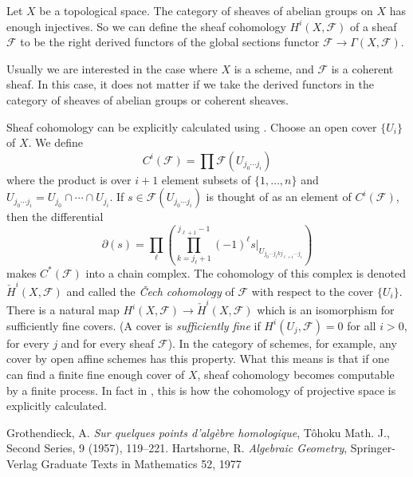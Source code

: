 \documentclass[12pt]{article}
\newcommand{\F}{\mathcal{F}}
\begin{document}
Let $X$ be a topological space.   The category of sheaves of abelian groups on $X$ has enough injectives.  So we can define the sheaf cohomology $H^i(X,\mathcal{F})$ of a sheaf $\mathcal{F}$ to be the right derived functors of the global sections functor $\mathcal{F}\to \Gamma(X,\mathcal{F})$.

Usually we are interested in the case where $X$ is a scheme, and $\mathcal{F}$ is a coherent sheaf.  In this case, it does not matter if we take the derived functors in the category of sheaves of abelian groups or coherent sheaves.

Sheaf cohomology can be explicitly calculated using .  Choose an open cover $\{U_i\}$ of $X$.  We define
\[
C^i(\F)=\prod \F(U_{j_0\cdots j_i})
\]
where the product is over $i+1$ element subsets of $\{1,\ldots,n\}$
and $U_{j_0\cdots j_i}=U_{j_0}\cap\cdots\cap U_{j_i}$.  If
$s\in\F(U_{j_0\cdots j_i})$ is thought of as an element of $C^i(\F)$,
then the differential 
\[
\partial(s)=\prod_{\ell}
\left(\prod_{k=j_{\ell}+1}^{j_{\ell+1}-1}(-1)^\ell s|_{U_{j_0\cdots
    j_\ell k j_{\ell+1}\cdots j_i}}\right)
\]
makes $C^*(\F)$ into a chain complex.  The cohomology of this complex is denoted $\check{H}^i(X,\F)$ and called the {\em \v{C}ech cohomology} of $\F$ with respect to the cover $\{U_i\}$.  There is a natural map $H^i(X,\F)\to\check{H}^i(X,\F)$ which is an isomorphism for sufficiently fine covers.  (A cover is \emph{sufficiently fine} if $H^i(U_j,\F)=0$ for all $i>0$, for every $j$ and for every sheaf $\F$).  In the category of schemes, for example, any cover by open affine schemes has this property.  What this means is that if one can find a finite fine enough cover of $X$, sheaf cohomology becomes computable by a finite process.  In fact in \cite{H}, this is how the cohomology of projective space is explicitly calculated. 

\begin{thebibliography}{9}
Grothendieck, A. \emph{Sur quelques points d'alg\`{e}bre homologique}, 
T\^{o}hoku Math. J., Second Series, 9 (1957), 119--221.
  Hartshorne, R. \emph{Algebraic Geometry}, Springer-Verlag Graduate Texts in Mathematics 52, 1977
\end{thebibliography}
\end{document}
